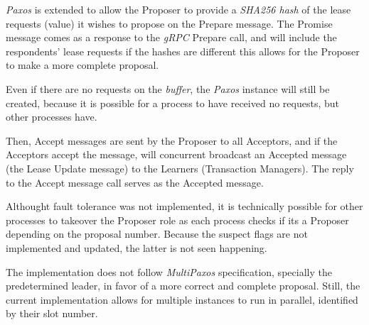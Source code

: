 \documentclass[times, 10pt,twocolumn]{article}
\begin{document}
\textit{Paxos} \cite{Paxos} is extended to allow the Proposer to provide a \textit{SHA256 hash} of
the lease requests (value) it wishes to propose on the Prepare message. The Promise
message comes as a response to the \textit{gRPC} Prepare call, and will include the
respondents' lease requests if the hashes are different \textendash this allows for the Proposer
to make a more complete proposal.

Even if there are no requests on the \textit{buffer}, the \textit{Paxos} instance will
still be created, because it is possible for a process to have received no requests,
but other processes have.

Then, Accept messages are sent by the Proposer to all Acceptors, and if the Acceptors accept the message,
will concurrent broadcast an Accepted message (the Lease Update message) to the Learners (Transaction Managers).
The reply to the Accept message call serves as the Accepted message.

Althought fault tolerance was not implemented, it is technically possible for other processes
to takeover the Proposer role as each process checks if its a Proposer depending on the proposal number.
Because the suspect flags are not implemented and updated, the latter is not seen happening.

The implementation does not follow \textit{MultiPaxos} specification, specially the 
predetermined leader, in favor of a more correct and complete proposal. Still,
the current implementation allows for multiple instances to run in parallel, identified by
their slot number.



\end{document}
